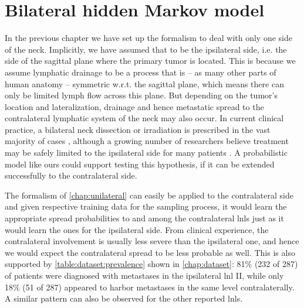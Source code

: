 \documentclass[\relativeRoot/main.tex]{subfiles}
\begin{document}
\chapter{Bilateral hidden Markov model}
\label{chap:bilateral}

In the previous chapter we have set up the formalism to deal with only one side of the neck. Implicitly, we have assumed that to be the ipsilateral side, i.e. the side of the sagittal plane where the primary tumor is located. This is because we assume lymphatic drainage to be a process that is -- as many other parts of human anatomy -- symmetric w.r.t. the sagittal plane, which means there can only be limited lymph flow across this plane. But depending on the tumor's location and lateralization, drainage and hence metastatic spread to the contralateral lymphatic system of the neck may also occur. In current clinical practice, a bilateral neck dissection or irradiation is prescribed in the vast majority of cases \cite{de_veij_mestdagh_incidence_2019}, although a growing number of researchers believe treatment may be safely limited to the ipsilateral side for many patients \cite{rackley_unilateral_2017,de_veij_mestdagh_spectct-guided_2020}. A probabilistic model like ours could support testing this hypothesis, if it can be extended successfully to the contralateral side.

The formalism of \cref{chap:unilateral} can easily be applied to the contralateral side and given respective training data for the sampling process, it would learn the appropriate spread probabilities to and among the contralateral \glspl{lnl} just as it would learn the ones for the ipsilateral side. From clinical experience, the contralateral involvement is usually less severe than the ipsilateral one, and hence we would expect the contralateral spread to be less probable as well. This is also supported by \cref{table:dataset:prevalence} shown in \cref{chap:dataset}: 81\% (232 of 287) of patients were diagnosed with metastases in the ipsilateral \gls{lnl} II, while only 18\% (51 of 287) appeared to harbor metastases in the same level contralaterally. A similar pattern can also be observed for the other reported \glspl{lnl}.
\end{document}
